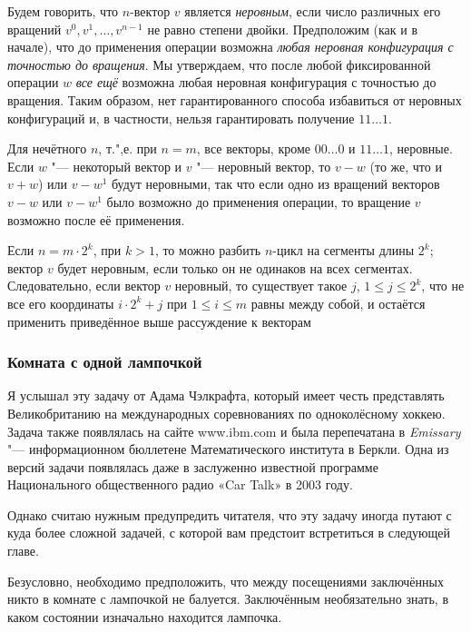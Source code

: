 \documentclass[twoside]{book}
\begin{document}
Будем говорить, что $n$-вектор $v$ является \emph{неровным}, %
если число различных его вращений $v^0,v^1,\dots,v^{n-1}$ не равно степени двойки.
Предположим (как и в начале), что до применения операции возможна \emph{любая неровная конфигурация с точностью до вращения}.
Мы утверждаем, что после любой фиксированной операции $w$ \emph{все ещё} возможна любая неровная конфигурация с точностью до вращения.
Таким образом, нет гарантированного способа избавиться от неровных конфигураций и, в частности, нельзя гарантировать получение $11\dots1$.

Для нечётного $n$, т.",е. при $n=m$, все векторы, кроме $00\dots0$ и $11\dots1$, неровные.
Если $w$ "--- некоторый вектор и $v$ "--- неровный вектор, то $v-w$ (то же, что и $v+w$) или $v-w^1$ будут неровными, так что если одно из вращений векторов $v-w$ или $v-w^1$ было возможно до применения операции, то вращение $v$ возможно после её применения.

Если $n=m\cdot 2^k$, при $k>1$, то можно разбить $n$-цикл на сегменты длины $2^k$; вектор $v$ будет неровным, если только он не одинаков на всех сегментах.
Следовательно, если вектор $v$ неровный, то существует такое $j$, $1\le j\le 2^k$, что не все его координаты $i\cdot 2^k+j$ при $1\le i\le m$ равны между собой, и остаётся применить приведённое выше рассуждение к векторам 

\subsubsection*{Комната с одной лампочкой}%

Я услышал эту задачу от Адама Чэлкрафта, %
который имеет честь представлять Великобританию на международных соревнованиях по одноколёсному хоккею.
Задача также появлялась на сайте www.ibm.com и была перепечатана в \emph{Emissary} "--- информационном бюллетене Математического института в Беркли. %
Одна из версий задачи появлялась даже в заслуженно известной программе Национального общественного радио «Car Talk» в 2003 году.

Однако считаю нужным предупредить читателя, что эту задачу иногда путают с куда более сложной задачей, с которой вам предстоит встретиться в следующей главе.

\medskip

Безусловно, необходимо предположить, что между посещениями заключённых никто в комнате с лампочкой не балуется.
Заключённым необязательно знать, в каком состоянии изначально находится лампочка.
\end{document}
